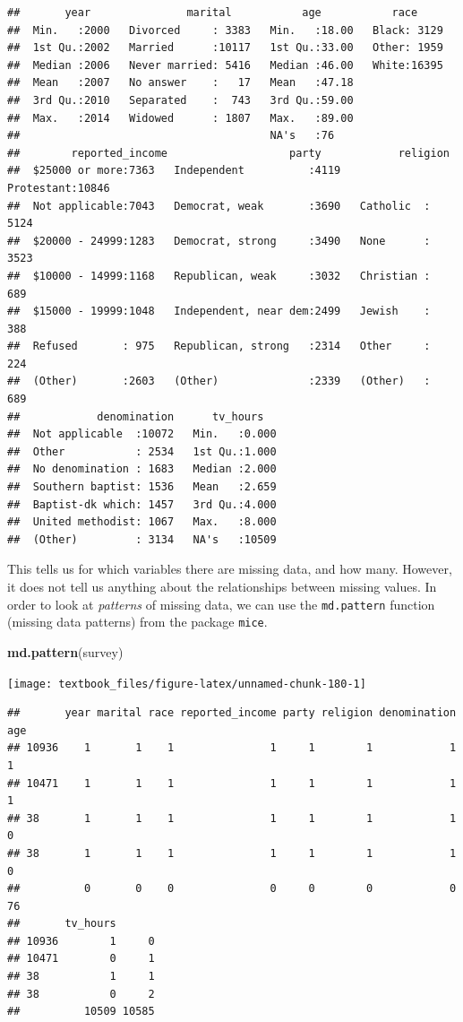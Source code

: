 \documentclass[]{tufte-book}
\newenvironment{Shaded}{}{}
\newcommand{\KeywordTok}[1]{\textcolor[rgb]{0.00,0.44,0.13}{\textbf{#1}}}
\newcommand{\NormalTok}[1]{#1}
\begin{document}
\begin{verbatim}
##       year               marital           age           race      
##  Min.   :2000   Divorced     : 3383   Min.   :18.00   Black: 3129  
##  1st Qu.:2002   Married      :10117   1st Qu.:33.00   Other: 1959  
##  Median :2006   Never married: 5416   Median :46.00   White:16395  
##  Mean   :2007   No answer    :   17   Mean   :47.18                
##  3rd Qu.:2010   Separated    :  743   3rd Qu.:59.00                
##  Max.   :2014   Widowed      : 1807   Max.   :89.00                
##                                       NA's   :76                   
##        reported_income                   party            religion    
##  $25000 or more:7363   Independent          :4119   Protestant:10846  
##  Not applicable:7043   Democrat, weak       :3690   Catholic  : 5124  
##  $20000 - 24999:1283   Democrat, strong     :3490   None      : 3523  
##  $10000 - 14999:1168   Republican, weak     :3032   Christian :  689  
##  $15000 - 19999:1048   Independent, near dem:2499   Jewish    :  388  
##  Refused       : 975   Republican, strong   :2314   Other     :  224  
##  (Other)       :2603   (Other)              :2339   (Other)   :  689  
##            denomination      tv_hours    
##  Not applicable  :10072   Min.   :0.000  
##  Other           : 2534   1st Qu.:1.000  
##  No denomination : 1683   Median :2.000  
##  Southern baptist: 1536   Mean   :2.659  
##  Baptist-dk which: 1457   3rd Qu.:4.000  
##  United methodist: 1067   Max.   :8.000  
##  (Other)         : 3134   NA's   :10509
\end{verbatim}

This tells us for which variables there are missing data, and how many. However, it does not tell us anything about the relationships between missing values. In order to look at \emph{patterns} of missing data, we can use the \texttt{md.pattern} function (missing data patterns) from the package \texttt{mice}.

\begin{Shaded}
\begin{Highlighting}[]
\KeywordTok{md.pattern}\NormalTok{(survey)}
\end{Highlighting}
\end{Shaded}

\texttt{[image: textbook\_files/figure-latex/unnamed-chunk-180-1]}

\begin{verbatim}
##       year marital race reported_income party religion denomination age
## 10936    1       1    1               1     1        1            1   1
## 10471    1       1    1               1     1        1            1   1
## 38       1       1    1               1     1        1            1   0
## 38       1       1    1               1     1        1            1   0
##          0       0    0               0     0        0            0  76
##       tv_hours      
## 10936        1     0
## 10471        0     1
## 38           1     1
## 38           0     2
##          10509 10585
\end{verbatim}
\end{document}
